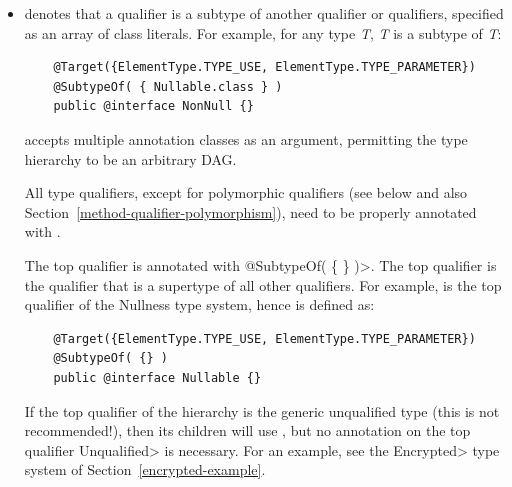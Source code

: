 \begin{itemize}

\item {} denotes that a qualifier is a subtype of
  another qualifier or qualifiers, specified as an array of class
  literals.  For example, for any type \textit{T},
   \textit{T} is a subtype of  \textit{T}:

  \begin{Verbatim}
    @Target({ElementType.TYPE_USE, ElementType.TYPE_PARAMETER})
    @SubtypeOf( { Nullable.class } )
    public @interface NonNull {}
  \end{Verbatim}



   accepts multiple annotation classes as an argument,
  permitting the type hierarchy to be an arbitrary DAG\@.


  All type qualifiers, except for polymorphic qualifiers (see below and
  also Section~\ref{method-qualifier-polymorphism}), need to be
  properly annotated with .

  The top qualifier is annotated with
  \<@SubtypeOf( \{ \} )>.  The top qualifier is the qualifier that is
  a supertype of all other qualifiers.  For example, 
  is the top qualifier of the Nullness type system, hence is defined as:

  \begin{Verbatim}
    @Target({ElementType.TYPE_USE, ElementType.TYPE_PARAMETER})
    @SubtypeOf( {} )
    public @interface Nullable {}
  \end{Verbatim}

  \begin{sloppypar}
  If the top qualifier of the hierarchy is the generic unqualified type
  (this is not recommended!), then its children
  will use , but no
   annotation on the top qualifier \<Unqualified> is
  necessary.  For an example, see the
  \<Encrypted> type system of Section~\ref{encrypted-example}.
  \end{sloppypar}


\end{itemize}
